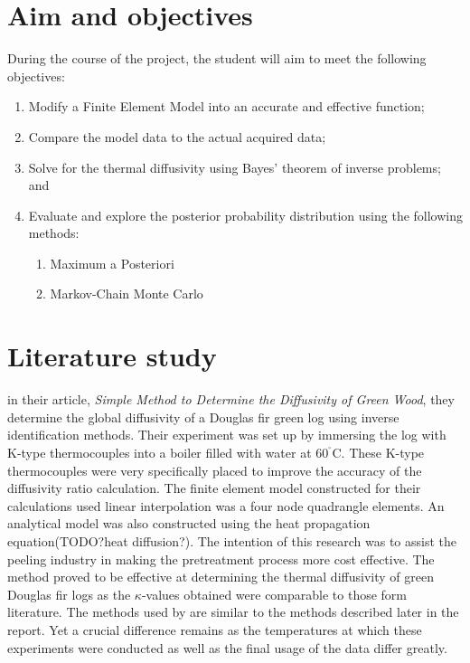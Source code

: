 \section{Aim and objectives}
During the course of the project, the student will aim to meet the following objectives:
\begin{enumerate}
 \item Modify a Finite Element Model into an accurate and effective function;
 \item Compare the model data to the actual acquired data;
 \item Solve for the thermal diffusivity using Bayes' theorem of inverse problems; and
 \item Evaluate and explore the posterior probability distribution using the following methods:
 	\begin{enumerate}
 		\item Maximum a Posteriori
 		\item Markov-Chain Monte Carlo 	
 	\end{enumerate}
\end{enumerate}

\section{Literature study}
	
	\citeauthor{bioresource:2020} in their article, \textit{Simple Method to Determine the Diffusivity of Green Wood}, they determine the global diffusivity of a Douglas fir green log using inverse identification methods. 
	Their experiment was set up by immersing the log with K-type thermocouples into a boiler filled with water at 60$^{^{\circ}}$C. 
	These K-type thermocouples were very specifically placed to improve the accuracy of the diffusivity ratio calculation.
	The finite element model constructed for their calculations used linear interpolation was a four node quadrangle elements.
	An analytical model was also constructed using the heat propagation equation(TODO?heat diffusion?).
	The intention of this research was to assist the peeling industry in making the pretreatment process more cost effective.
	The method proved to be effective at determining the thermal diffusivity of green Douglas fir logs as the $\kappa$-values obtained were comparable to those form literature.
	The methods used by \citet{bioresource:2020} are similar to the methods described later in the report.
	Yet a crucial difference remains as the temperatures at which these experiments were conducted as well as the final usage of the data differ greatly.

